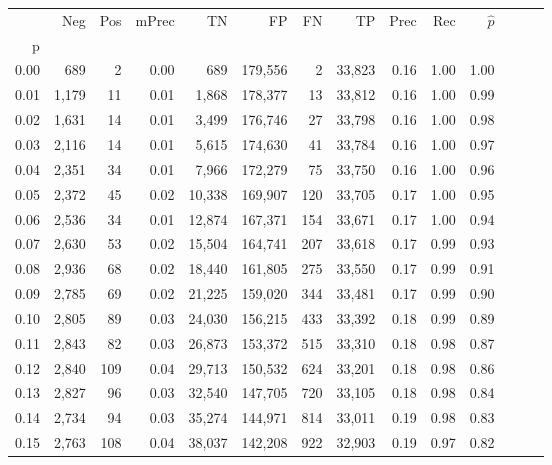 \begin{tabular}{rrrrrrrrrrrrrr}
\toprule
{} &    Neg &  Pos & mPrec &       TN &       FP &      FN &      TP &  Prec &   Rec & $\hat{p}$ \\
p    &        &      &       &          &          &         &         &       &       &           \\
\midrule
0.00 &    689 &    2 &  0.00 &      689 &  179,556 &       2 &  33,823 &  0.16 &  1.00 &      1.00 \\
0.01 &  1,179 &   11 &  0.01 &    1,868 &  178,377 &      13 &  33,812 &  0.16 &  1.00 &      0.99 \\
0.02 &  1,631 &   14 &  0.01 &    3,499 &  176,746 &      27 &  33,798 &  0.16 &  1.00 &      0.98 \\
0.03 &  2,116 &   14 &  0.01 &    5,615 &  174,630 &      41 &  33,784 &  0.16 &  1.00 &      0.97 \\
0.04 &  2,351 &   34 &  0.01 &    7,966 &  172,279 &      75 &  33,750 &  0.16 &  1.00 &      0.96 \\
0.05 &  2,372 &   45 &  0.02 &   10,338 &  169,907 &     120 &  33,705 &  0.17 &  1.00 &      0.95 \\
0.06 &  2,536 &   34 &  0.01 &   12,874 &  167,371 &     154 &  33,671 &  0.17 &  1.00 &      0.94 \\
0.07 &  2,630 &   53 &  0.02 &   15,504 &  164,741 &     207 &  33,618 &  0.17 &  0.99 &      0.93 \\
0.08 &  2,936 &   68 &  0.02 &   18,440 &  161,805 &     275 &  33,550 &  0.17 &  0.99 &      0.91 \\
0.09 &  2,785 &   69 &  0.02 &   21,225 &  159,020 &     344 &  33,481 &  0.17 &  0.99 &      0.90 \\
0.10 &  2,805 &   89 &  0.03 &   24,030 &  156,215 &     433 &  33,392 &  0.18 &  0.99 &      0.89 \\
0.11 &  2,843 &   82 &  0.03 &   26,873 &  153,372 &     515 &  33,310 &  0.18 &  0.98 &      0.87 \\
0.12 &  2,840 &  109 &  0.04 &   29,713 &  150,532 &     624 &  33,201 &  0.18 &  0.98 &      0.86 \\
0.13 &  2,827 &   96 &  0.03 &   32,540 &  147,705 &     720 &  33,105 &  0.18 &  0.98 &      0.84 \\
0.14 &  2,734 &   94 &  0.03 &   35,274 &  144,971 &     814 &  33,011 &  0.19 &  0.98 &      0.83 \\
0.15 &  2,763 &  108 &  0.04 &   38,037 &  142,208 &     922 &  32,903 &  0.19 &  0.97 &      0.82 \\

\end{tabular}
